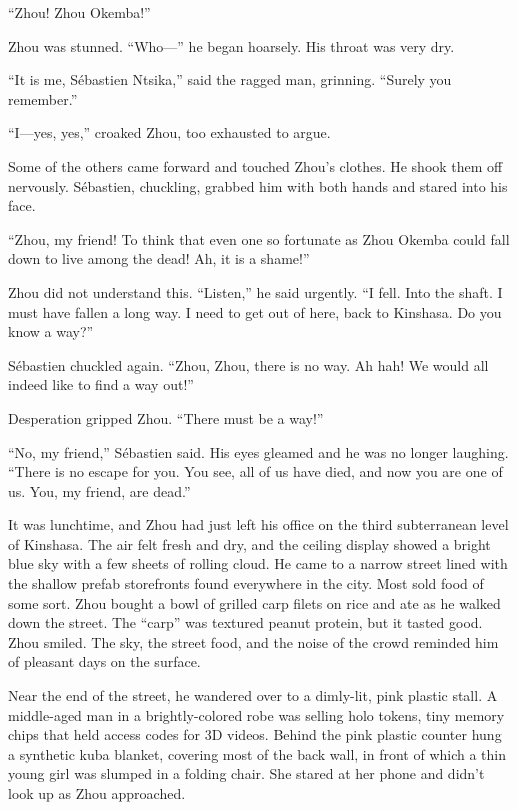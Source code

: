 \documentclass[10pt,a4paper]{article}
\begin{document}
``Zhou! Zhou Okemba!''

Zhou was stunned. ``Who---'' he began hoarsely. His throat was very dry.

``It is me, S\'{e}bastien Ntsika,'' said the ragged man, grinning. ``Surely
you remember.''

``I---yes, yes,'' croaked Zhou, too exhausted to argue.

Some of the others came forward and touched Zhou's clothes. He
shook them off nervously. S\'{e}bastien, chuckling, grabbed him with
both hands and stared into his face.

``Zhou, my friend! To think that even one so fortunate as Zhou Okemba
could fall down to live among the dead! Ah, it is a shame!''

Zhou did not understand this. ``Listen,'' he said urgently.
``I fell. Into the shaft. I must have fallen a long way. I need to
get out of here, back to Kinshasa. Do you know a way?''

S\'{e}bastien chuckled again. ``Zhou, Zhou, there is no way. Ah hah! We
would all indeed like to find a way out!''

Desperation gripped Zhou. ``There must be a way!''

``No, my friend,'' S\'{e}bastien said. His eyes gleamed and he was no
longer laughing. ``There is no escape for you. You see, all of us
have died, and now you are one of us. You, my friend, are dead.''

\bigskip

It was lunchtime, and Zhou had just left his office on the third
subterranean level of Kinshasa. The air felt fresh and dry, and the
ceiling display showed a bright blue sky with a few sheets of rolling
cloud. He came to a narrow street lined with the shallow prefab
storefronts found everywhere in the city. Most sold food of some
sort. Zhou bought a bowl of grilled carp filets on rice and ate as
he walked down the street. The ``carp'' was textured peanut protein,
but it tasted good. Zhou smiled. The sky, the street food, and the
noise of the crowd reminded him of pleasant days on the surface.

Near the end of the street, he wandered over to a dimly-lit, pink
plastic stall. A middle-aged man in a brightly-colored robe was
selling holo tokens, tiny memory chips that held access codes for
3D videos. Behind the pink plastic counter hung a synthetic kuba
blanket, covering most of the back wall, in front of which a thin
young girl was slumped in a folding chair. She stared at her phone
and didn't look up as Zhou approached.
\end{document}
